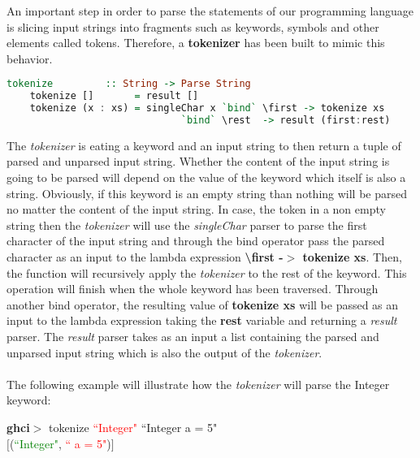 \documentclass[a4paper, onecolumn]{article}
\begin{document}
    An important step in order to parse the statements of our programming language is slicing input strings into fragments such as keywords, symbols and other elements called tokens. Therefore, a \textbf{tokenizer} has been built to mimic this behavior.
    
    \begin{tcolorbox}
    \begin{lstlisting}[language=Haskell] 
    tokenize         :: String -> Parse String
    tokenize []       = result []
    tokenize (x : xs) = singleChar x `bind` \first -> tokenize xs 
                              `bind` \rest  -> result (first:rest)
     \end{lstlisting}
    \end{tcolorbox}
    
    \noindent The \textit{tokenizer} is eating a keyword and an input string to then return a tuple of parsed and unparsed input string. Whether the content of the input string is going to be parsed will depend on the value of the keyword which itself is also a string. Obviously, if this keyword is an empty string than nothing will be parsed no matter the content of the input string. In case, the token in a non empty string then the \textit{tokenizer} will use the \textit{singleChar} parser to parse the first character of the input string and through the bind operator pass the parsed character as an input to the lambda expression \textbf{\textbackslash first -$>$ tokenize xs}. Then, the function will recursively apply the \textit{tokenizer} to the rest of the keyword. This operation will finish when the whole keyword has been traversed. Through another bind operator, the resulting value of \textbf{tokenize xs} will be passed as an input to the lambda expression taking the \textbf{rest} variable and returning a \textit{result} parser. The \textit{result} parser takes as an input a list containing the parsed and unparsed input string which is also the output of the \textit{tokenizer}. \\ \\
    The following example will illustrate how the \textit{tokenizer} will parse the Integer keyword:
    
    \begin{center}
            \textbf{ghci$>$} tokenize \textcolor{red}{``Integer"} ``Integer a = 5" \\
             $\big[$(\textcolor{green}{``Integer"}, \textcolor{red}{`` a = 5"})$\big]$
        \end{center}
    
\end{document}
